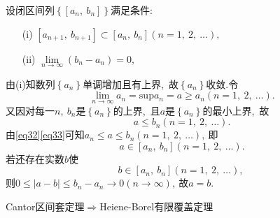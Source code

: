 \begin{solution}
	设闭区间列$\left\{\left[a_n,\ b_n\right]\right\}$满足条件:
	\begin{itemize}
		\item[(i)] $\left[a_{n+1},\ b_{n+1}\right]\subset\left[a_{n},\ b_{n}\right]\left(n=1,\ 2,\ \dots\right),\ $
		\item[(ii)] $\lim\limits_{n\rightarrow\infty}\left(b_n-a_n\right)=0,\ $
	\end{itemize}
	由(i)知数列$\left\{a_n\right\}$单调增加且有上界,\ 故$\left\{a_n\right\}$收敛.令
	\begin{equation}
		\lim\limits_{n\rightarrow\infty}a_n=\text{sup}a_n=a\ge a_n\left(n=1,\ 2,\ \dots\right).\label{eq32}
	\end{equation}
	又因对每一$n,\ b_n$是$\left\{a_n\right\}$的上界,\ 且$a$是$\left\{a_n\right\}$的最小上界,\ 故
	\begin{equation}
		a\le b_n\left(n=1,\ 2,\ \dots\right).\label{eq33}
	\end{equation}
	由\eqref{eq32}\eqref{eq33}可知$a_n\le a \le b_n\left(n=1,\ 2,\ \dots\right),\ $即
	$$a\in\left[a_n,\ b_n\right]\left(n=1,\ 2,\ \dots\right).$$
	若还存在实数$b$使
	$$b\in\left[a_n,\ b_n\right]\left(n=1,\ 2,\ \dots\right),\ $$
	则$0\le|a-b|\le b_n-a_n\rightarrow0\left(n\rightarrow\infty\right),\ $故$a=b.$ 
\end{solution}
\newpage
\begin{problem}
	Cantor区间套定理$\Rightarrow$Heiene-Borel有限覆盖定理
\end{problem}


